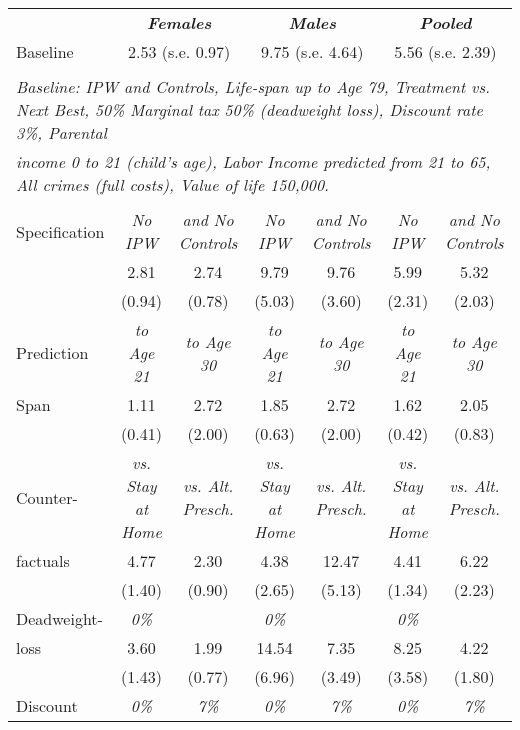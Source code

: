 \begin{tabular}{lcccccc} \toprule
	&	\multicolumn{2}{c}{\textbf{\textit{Females}}}	&	\multicolumn{2}{c}{\textbf{\textit{Males}}}	&	\multicolumn{2}{c}{\textbf{\textit{Pooled}}}	\\ 
Baseline	&	\multicolumn{2}{c}{2.53 (s.e. 0.97)}	&	\multicolumn{2}{c}{9.75 (s.e. 4.64)}	&	\multicolumn{2}{c}{5.56 (s.e. 2.39)}	\\ \\
\multicolumn{7}{l}{\textit{Baseline: IPW and Controls, Life-span up to Age 79, Treatment vs. Next Best, 50\% Marginal tax 50\% (deadweight loss), Discount rate 3\%, Parental}} \\ 
\multicolumn{7}{l}{\textit{income 0 to 21 (child's age), Labor Income predicted from 21 to 65, All crimes (full costs), Value of life 150,000.}} \\ \\ \midrule	
Specification	&	\textit{No IPW}	&	\textit{and No Controls}	&	\textit{No IPW}	&	\textit{and No Controls}	&	\textit{No IPW}	&	\textit{and No Controls}	\\
	&	2.81	&	2.74	&	9.79	&	9.76	&	5.99	&	5.32	\\
	&	(0.94)	&	(0.78)	&	(5.03)	&	(3.60)	&	(2.31)	&	(2.03)	\\ \midrule
Prediction	&	\textit{to Age 21}	&	\textit{to Age 30}	&	\textit{to Age 21}	&	\textit{to Age 30}	&	\textit{to Age 21}	&	\textit{to Age 30}	\\
Span	&	1.11	&	2.72	&	1.85	&	2.72	&	1.62	&	2.05	\\
	&	(0.41)	&	(2.00)	&	(0.63)	&	(2.00)	&	(0.42)	&	(0.83)	\\ \midrule
Counter-	&	\textit{vs. Stay at Home}	&	\textit{vs. Alt. Presch.}	&	\textit{vs. Stay at Home}	&	\textit{vs. Alt. Presch.}	&	\textit{vs. Stay at Home}	&	\textit{vs. Alt. Presch.}	\\
factuals	&	4.77	&	2.30	&	4.38	&	12.47	&	4.41	&	6.22	\\
	&	(1.40)	&	(0.90)	&	(2.65)	&	(5.13)	&	(1.34)	&	(2.23)	\\ \midrule
Deadweight-	&	\textit{0\%}	&	\textit{100\%\textit}	&	\textit{0\%}	&	\textit{100\%\textit}	&	\textit{0\%}	&	\textit{100\%\textit}	\\
loss	&	3.60	&	1.99	&	14.54	&	7.35	&	8.25	&	4.22	\\
	&	(1.43)	&	(0.77)	&	(6.96)	&	(3.49)	&	(3.58)	&	(1.80)	\\ \midrule
Discount 	&	\textit{0\%}	&	\textit{7\%}	&	\textit{0\%}	&	\textit{7\%}	&	\textit{0\%}	&	\textit{7\%}	\\

\end{tabular}
